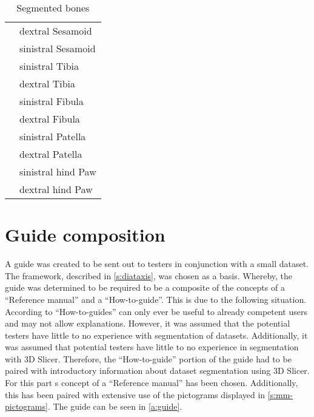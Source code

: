 \begin{table}
\begin{center}
\begin{tabular}{l l}
			                  & dextral Sesamoid        \\
			                  & sinistral Sesamoid      \\
			                  & sinistral Tibia         \\
			                  & dextral Tibia           \\
			                  & sinistral Fibula        \\
			                  & dextral Fibula          \\
			                  & sinistral Patella       \\
			                  & dextral Patella         \\
			                  & sinistral hind Paw      \\
			                  & dextral hind Paw        \\
			\hline
		\end{tabular}
		\caption{Segmented bones}\label{tab:bones}
	\end{center}
\end{table}


\section{Guide composition}\label{s:guide_comp}
A guide was created to be sent out to testers in conjunction with a small dataset.
The \diatx\space framework, described in \cref{s:diataxis}, was chosen as a basis.
Whereby, the guide was determined to be required to be a composite of the \diatx\space concepts of a
``Reference manual'' and a ``How-to-guide''.
This is due to the following situation.
According to \citeauthor{procidaDiataxisDocumentationFramework2023} ``How-to-guides'' can only ever be useful to already competent users and may not allow explanations.
However, it was assumed that the potential testers have little to no experience with segmentation of \mct\space datasets.
Additionally, it was assumed that potential testers have little to no experience in segmentation with 3D Slicer.
Therefore, the ``How-to-guide'' portion of the guide had to be paired with introductory information about \mct\space dataset segmentation using 3D Slicer.
For this part \citeauthor{procidaDiataxisDocumentationFramework2023}s \diatx\space concept of a ``Reference manual'' has been chosen.
Additionally, this has been paired with extensive use of the pictograms displayed in \cref{s:mm-pictograms}.
The guide can be seen in \cref{a:guide}.


